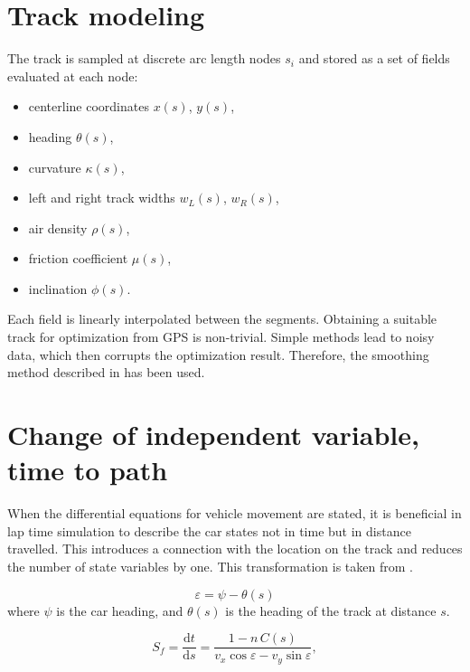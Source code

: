 \section{Track modeling}
The track is sampled at discrete arc length nodes $s_i$ and stored as a set of
fields evaluated at each node:
\begin{itemize}
	\item centerline coordinates $x(s)$, $y(s)$,
	\item heading $\theta(s)$,
	\item curvature $\kappa(s)$,
	\item left and right track widths $w_L(s)$, $w_R(s)$,
	\item air density $\rho(s)$,
	\item friction coefficient $\mu(s)$,
	\item inclination $\phi(s)$.
\end{itemize}
Each field is linearly interpolated between the segments. Obtaining a suitable track for optimization from GPS is non-trivial. Simple methods lead to noisy data, which then corrupts the optimization result. Therefore, the smoothing method described in \cite{perantoniOptimalControlFormula2014} has been used.

\section{Change of independent variable, time to path}
When the differential equations for vehicle movement are stated, it is
beneficial in lap time simulation to describe the car states not in time but in
distance travelled. This introduces a connection with the location on the
track and reduces the number of state variables by one. This transformation is
taken from \cite{perantoniOptimalControlFormula2014}.

\begin{equation}
	\varepsilon = \psi - \theta(s)
\end{equation}
where $\psi$ is the car heading, and $\theta(s)$ is the heading of the track at distance $s$.

\begin{equation}
	S_f = \frac{\mathrm{d}t}{\mathrm{d}s} = \frac{1 - n\, C(s)}{v_x \cos\varepsilon - v_y \sin\varepsilon},
	\label{time2path}
\end{equation}

